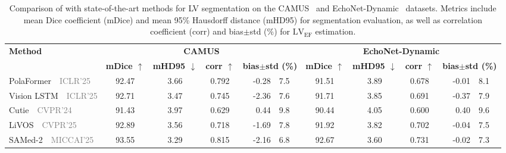 \begin{table}[!t]
    \centering
    \caption{Comparison of \mymodel with state-of-the-art methods for LV segmentation on the CAMUS~\cite{tmi19_camus} and EchoNet-Dynamic~\cite{nature20_echodynamic} datasets.
        Metrics include mean Dice coefficient (mDice) and mean 95\% Hausdorff distance (mHD95) for segmentation evaluation, as well as correlation coefficient (corr) and bias$\pm$std (\%) for $\text{LV}_{\text{EF}}$ estimation.}
    \label{tab:lv_segmentation_comparison}

    \small
    \setlength{\tabcolsep}{6pt}

    \begin{tabular}{l ccc r@{${}\pm{}$}l ccc r@{${}\pm{}$}l}
        \toprule

        \textbf{Method} & \multicolumn{5}{c}{\textbf{CAMUS}} & \multicolumn{5}{c}{\textbf{EchoNet-Dynamic}} \\
        \cmidrule(lr){2-6} \cmidrule(lr){7-11}

        & \textbf{mDice $\uparrow$} & \textbf{mHD95 $\downarrow$} & \textbf{corr $\uparrow$} & \multicolumn{2}{c}{\textbf{bias$\pm$std (\%)}} & \textbf{mDice $\uparrow$} & \textbf{mHD95 $\downarrow$} & \textbf{corr $\uparrow$} & \multicolumn{2}{c}{\textbf{bias$\pm$std (\%)}} \\
        \midrule

        PolaFormer~\cite{PolaFormer}~\textcolor{gray}{\scriptsize ICLR'25} &
        92.47 & 3.66 & 0.792 & -0.28 & 7.5 &
        91.51 & 3.89 & 0.678 & -0.01 & 8.1 \\

        Vision LSTM~\cite{ICLR2025_3b6eaef6}~\textcolor{gray}{\scriptsize ICLR'25} &
        92.71 & 3.47 & 0.745 & -2.36 & 7.6 &
        91.71 & 3.85 & 0.691 & -0.37 & 7.9 \\

        Cutie~\cite{cvpr24_cutie}~\textcolor{gray}{\scriptsize CVPR'24} &
        91.43 & 3.97 & 0.629 &  0.44 & 9.8 &
        90.44 & 4.05 & 0.600 &  0.40 & 9.6 \\

        LiVOS~\cite{Liu_2025_CVPR}~\textcolor{gray}{\scriptsize CVPR'25} &
        92.89 & 3.56 & 0.718 & -1.69 & 7.8 &
        91.92 & 3.82 & 0.702 & -0.04 & 7.5 \\
        \midrule

        SAMed-2~\cite{MICCAI25_SAMed2}~\textcolor{gray}{\scriptsize MICCAI'25} &
        93.55 & 3.29 & 0.815 & -2.16 & 6.8 &
        92.67 & 3.60 & 0.731 & -0.02 & 7.3 \\


\end{tabular}
\end{table}

